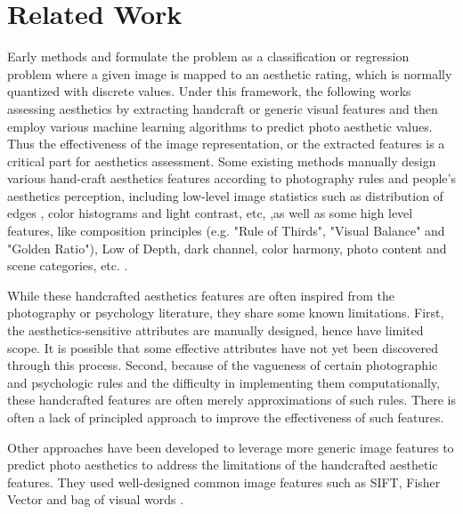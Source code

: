 \documentclass[10pt,twocolumn,letterpaper]{article}
\begin{document}
\section{Related Work}
Early methods \cite{Datta:2006:ECCV} and \cite{Ke:2006:CVPR} formulate 
the problem  as a classification or regression problem where a given image is
mapped to an aesthetic rating, which is normally quantized with discrete
values. Under this framework, the following works assessing 
aesthetics by extracting handcraft or generic visual features 
and then employ various machine learning algorithms to predict 
photo aesthetic values. Thus the effectiveness of the image representation,
or the extracted features is a critical part for aesthetics assessment.
Some existing methods manually design various hand-craft aesthetics features 
according to photography rules and people’s aesthetics perception,
including low-level image statistics such as distribution of edges 
, color histograms and light contrast, etc, \cite{Luo:2008:ECCV} 
\cite{Bhattacharya:2010:ACMMM} ,as well as some high level
features, like composition principles (e.g. "Rule of Thirds", "Visual Balance" 
and "Golden Ratio"), Low of Depth, dark channel, color harmony, photo content 
and scene categories, etc. \cite{Tang:2013:TMM} \cite{Sagnik:2011:CVPR} 
\cite{Su:2011:ACMMM} \cite{Cohen-Or:2006:SIGGRAPH}.

While these handcrafted aesthetics features are often inspired 
from the photography or psychology literature, they share some 
known limitations. First, the aesthetics-sensitive attributes 
are manually designed, hence have limited scope. It is possible 
that some effective attributes have not yet been discovered 
through this process. Second, because of the vagueness of certain 
photographic and psychologic rules and the difficulty in implementing 
them computationally, these handcrafted features are often merely approximations
of such rules. There is often a lack of principled approach to improve the 
effectiveness of such features.

Other approaches have been developed to leverage more 
generic image features to predict photo aesthetics to 
address the limitations of the handcrafted aesthetic features. 
They used well-designed common image features such as SIFT, Fisher Vector 
\cite{Marchesotti:2011:ICCV} \cite{Perronnin:2010:ECCV}  
and bag of visual words \cite{Su:2011:ACMMM}. 
\end{document}
